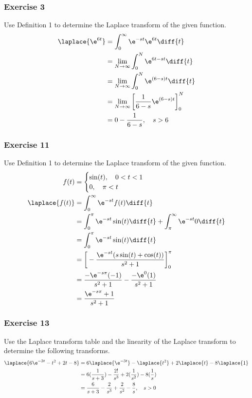 \documentclass{math}
\begin{document}
\subsubsection*{Exercise 3}
Use Definition 1 to determine the Laplace transform of the given function.
\begin{align*}
  \laplace{\e^{6t}} &= \int_{0}^{\infty}\e^{-st}\e^{6t}\diff{t} \\
  &= \lim_{N\to\infty}\int_{0}^{N}\e^{6t-st}\diff{t} \\
  &= \lim_{N\to\infty}\int_{0}^{N}\e^{(6-s)t}\diff{t} \\
  &= \lim_{N\to\infty}\bigg[\frac{1}{6-s}\e^{(6-s)t}\bigg]_{0}^{N} \\
  &= 0-\frac{1}{6-s}, \quad s > 6 \\
\end{align*}

\subsubsection*{Exercise 11}
Use Definition 1 to determine the Laplace transform of the given function.
\begin{align*}
  f(t) &= \begin{cases}
    \sin(t), \quad 0<t<1 \\
    0, \quad \pi<t
  \end{cases} \\
  \laplace{f(t)} &= \int_{0}^{\infty}\e^{-st}f(t)\diff{t} \\
  &= \int_{0}^{\pi}\e^{-st}\sin(t)\diff{t}+
    \int_{\pi}^{\infty}\e^{-st}0\diff{t} \\
  &= \int_{0}^{\pi}\e^{-st}\sin(t)\diff{t} \\
  &= \bigg[-\frac{\e^{-st}(s\sin(t)+\cos(t))}{s^2+1}\bigg]_{0}^{\pi} \\
  &= \frac{-\e^{-s\pi}(-1)}{s^2+1}-\frac{-\e^{0}(1)}{s^2+1} \\
  &= \frac{\e^{-s\pi}+1}{s^2+1}
\end{align*}

\subsubsection*{Exercise 13}
Use the Laplace transform table and the linearity of the Laplace transform to
determine the following transforms.
\begin{align*}
  \laplace{6\e^{-3t}-t^2+2t-8} &= 6\laplace{\e^{-3t}}-\laplace{t^2}+
    2\laplace{t}-8\laplace{1} \\
  &= 6(\frac{1}{s+3})-\frac{2!}{s^3}+2(\frac{1}{s^2})-8(\frac{1}{s}) \\
  &= \frac{6}{s+3}-\frac{2}{s^3}+\frac{2}{s^2}-\frac{8}{s}, \quad s>0
\end{align*}
\end{document}

